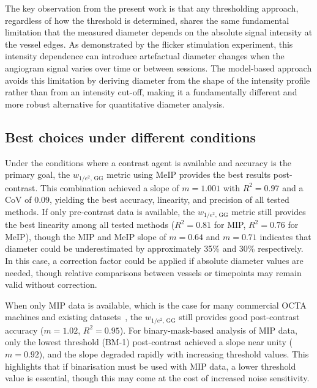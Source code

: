 \documentclass{optica-article}
\begin{document}
The key observation from the present work is that any thresholding approach, regardless of how the threshold is determined, shares the same fundamental limitation that the measured diameter depends on the absolute signal intensity at the vessel edges. As demonstrated by the flicker stimulation experiment, this intensity dependence can introduce artefactual diameter changes when the angiogram signal varies over time or between sessions. The model-based approach avoids this limitation by deriving diameter from the shape of the intensity profile rather than from an intensity cut-off, making it a fundamentally different and more robust alternative for quantitative diameter analysis.

\subsection{Best choices under different conditions}
\label{subsec:best_choices}
Under the conditions where a contrast agent is available and accuracy is the primary goal, the $w_{1/e^2,\,\mathrm{GG}}$ metric using MeIP provides the best results post-contrast. This combination achieved a slope of $m = 1.001$ with $R^2 = 0.97$ and a CoV of 0.09, yielding the best accuracy, linearity, and precision of all tested methods. If only pre-contrast data is available, the $w_{1/e^2,\,\mathrm{GG}}$ metric still provides the best linearity among all tested methods ($R^2 = 0.81$ for MIP, $R^2 = 0.76$ for MeIP), though the MIP and MeIP slope of $m = 0.64$ and $m = 0.71$ indicates that diameter could be underestimated by approximately 35\% and 30\% respectively. In this case, a correction factor could be applied if absolute diameter values are needed, though relative comparisons between vessels or timepoints may remain valid without correction.

When only MIP data is available, which is the case for many commercial OCTA machines and existing datasets~\cite{sampsonTowardsStandardizingRetinal2022,untrachtTowardsStandardisingRetinal2024}, the $w_{1/e^2,\,\mathrm{GG}}$ still provides good post-contrast accuracy ($m = 1.02$, $R^2 = 0.95$). For binary-mask-based analysis of MIP data, only the lowest threshold (BM-1) post-contrast achieved a slope near unity ($m = 0.92$), and the slope degraded rapidly with increasing threshold values. This highlights that if binarisation must be used with MIP data, a lower threshold value is essential, though this may come at the cost of increased noise sensitivity.
\end{document}
